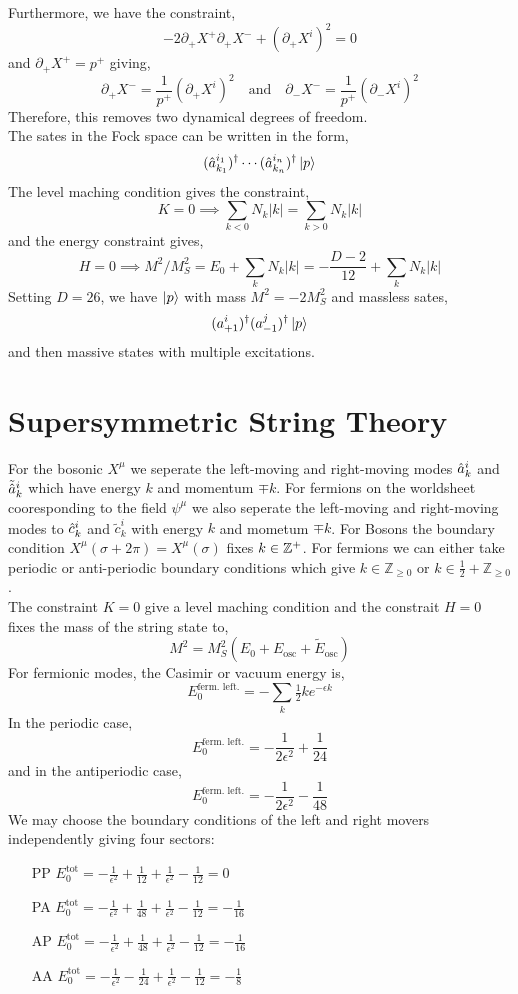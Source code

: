 \documentclass[12pt]{extarticle}
\begin{document}
Furthermore, we have the constraint,
\[ - 2 \partial_+ X^+ \partial_+ X^- + (\partial_+ X^i)^2 = 0 \]
and $\partial_+ X^+ = p^+$ giving,
\[ \partial_+ X^- = \frac{1}{p^+} (\partial_+ X^i)^2 \quad \text{and} \quad \partial_- X^- = \frac{1}{p^+} (\partial_- X^i)^2 \]
Therefore, this removes two dynamical degrees of freedom. 
\bigskip\\
The sates in the Fock space can be written in the form,
\[ (\hat{a}_{k_1}^{i_1})^\dagger \cdots (\hat{a}_{k_n}^{i_n})^\dagger \left| p \right> \]
The level maching condition gives the constraint,
\[ K = 0 \implies \sum_{k < 0} N_k |k| = \sum_{k > 0} N_k |k| \]
and the energy constraint gives,
\[ H = 0 \implies M^2 / M_S^2 = E_0 + \sum_{k} N_k |k| = - \frac{D - 2}{12} + \sum_{k} N_k |k| \] 
Setting $D = 26$, we have $\left| p \right>$ with mass $M^2 = - 2 M_S^2$ and massless sates,
\[ (a_{+1}^i)^\dagger (a_{-1}^j)^\dagger \left| p \right> \]
and then massive states with multiple excitations. 

\section{Supersymmetric String Theory}
\newcommand{\Z}{\mathbb{Z}}

For the bosonic $X^\mu$ we seperate the left-moving and right-moving modes $\hat{a}^i_k$ and $\tilde{\hat{a}}^i_k$ which have energy $k$ and momentum $\mp k$. For fermions on the worldsheet cooresponding to the field $\psi^\mu$ we also seperate the left-moving and right-moving modes to $\hat{c}^i_k$ and $\tilde{c}^i_k$ with energy $k$ and mometum $\mp k$. For Bosons the boundary condition $X^\mu(\sigma + 2 \pi) = X^\mu(\sigma)$ fixes $k \in \mathbb{Z}^{+}$. For fermions we can either take periodic or anti-periodic boundary conditions which give $k \in \Z_{\ge 0}$ or $k \in \tfrac{1}{2} + \Z_{\ge 0}$. 
\bigskip\\
The constraint $K = 0$ give a level maching condition and the constrait $H = 0$ fixes the mass of the string state to,
\[ M^2 = M_S^2 \left( E_0 + E_\text{osc} + \tilde{E}_{\text{osc}} \right) \] 
For fermionic modes, the Casimir or vacuum energy is,
\[ E_0^{\text{ferm. left.}} = - \sum_{k} \tfrac{1}{2} k e^{- \epsilon k} \]
In the periodic case, 
\[ E_0^{\text{ferm. left.}} = - \frac{1}{2 \epsilon^2} + \frac{1}{24} \]
and in the antiperiodic case,
\[ E_0^{\text{ferm. left.}}  = - \frac{1}{2 \epsilon^2} - \frac{1}{48} \]
We may choose the boundary conditions of the left and right movers independently giving four sectors:
\begin{enumerate}
\item[PP] $E_0^{\text{tot}} = - \frac{1}{\epsilon^2} + \frac{1}{12} + \frac{1}{\epsilon^2}  - \frac{1}{12} = 0$
\item[PA] $E_0^{\text{tot}} = - \frac{1}{\epsilon^2} + \frac{1}{48} + \frac{1}{\epsilon^2}  - \frac{1}{12} = - \frac{1}{16}$
\item[AP] $E_0^{\text{tot}} = - \frac{1}{\epsilon^2} + \frac{1}{48} + \frac{1}{\epsilon^2}  - \frac{1}{12} = - \frac{1}{16}$
\item[AA] $E_0^{\text{tot}} = - \frac{1}{\epsilon^2} - \frac{1}{24} + \frac{1}{\epsilon^2}  - \frac{1}{12} = - \frac{1}{8}$
\end{enumerate}
\end{document}
